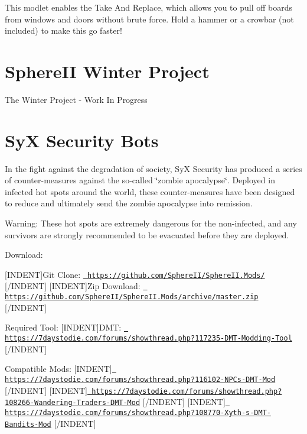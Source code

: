 This modlet enables the Take And Replace, which allows you to pull off boards from windows and doors without brute force. Hold a hammer or a crowbar (not included) to make this go faster!\hypertarget{md__c_1__users_jkilpatrick__documents__git_hub__sphere_i_i_8_mods__r_e_a_d_m_e_autotoc_md15}{}\section{Sphere\+I\+I Winter Project}\label{md__c_1__users_jkilpatrick__documents__git_hub__sphere_i_i_8_mods__r_e_a_d_m_e_autotoc_md15}
The Winter Project -\/ Work In Progress\hypertarget{md__c_1__users_jkilpatrick__documents__git_hub__sphere_i_i_8_mods__r_e_a_d_m_e_autotoc_md16}{}\section{Sy\+X Security Bots}\label{md__c_1__users_jkilpatrick__documents__git_hub__sphere_i_i_8_mods__r_e_a_d_m_e_autotoc_md16}
In the fight against the degradation of society, SyX Security has produced a series of counter-\/measures against the so-\/called \char`\"{}zombie apocalypse\char`\"{}. Deployed in infected hot spots around the world, these counter-\/measures have been designed to reduce and ultimately send the zombie apocalypse into remission.

Warning\+: These hot spots are extremely dangerous for the non-\/infected, and any survivors are strongly recommended to be evacuated before they are deployed.



 Download\+:

\mbox{[}I\+N\+D\+E\+NT\mbox{]}Git Clone\+: \href{https://github.com/SphereII/SphereII.Mods/}{\texttt{ https\+://github.\+com/\+Sphere\+I\+I/\+Sphere\+I\+I.\+Mods/}} \mbox{[}/\+I\+N\+D\+E\+NT\mbox{]} \mbox{[}I\+N\+D\+E\+NT\mbox{]}Zip Download\+: \href{https://github.com/SphereII/SphereII.Mods/archive/master.zip}{\texttt{ https\+://github.\+com/\+Sphere\+I\+I/\+Sphere\+I\+I.\+Mods/archive/master.\+zip}} \mbox{[}/\+I\+N\+D\+E\+NT\mbox{]}

Required Tool\+: \mbox{[}I\+N\+D\+E\+NT\mbox{]}D\+MT\+: \href{https://7daystodie.com/forums/showthread.php?117235-DMT-Modding-Tool}{\texttt{ https\+://7daystodie.\+com/forums/showthread.\+php?117235-\/\+D\+M\+T-\/\+Modding-\/\+Tool}} \mbox{[}/\+I\+N\+D\+E\+NT\mbox{]}

Compatible Mods\+: \mbox{[}I\+N\+D\+E\+NT\mbox{]}\href{https://7daystodie.com/forums/showthread.php?116102-NPCs-DMT-Mod}{\texttt{ https\+://7daystodie.\+com/forums/showthread.\+php?116102-\/\+N\+P\+Cs-\/\+D\+M\+T-\/\+Mod}} \mbox{[}/\+I\+N\+D\+E\+NT\mbox{]} \mbox{[}I\+N\+D\+E\+NT\mbox{]}\href{https://7daystodie.com/forums/showthread.php?108266-Wandering-Traders-DMT-Mod}{\texttt{ https\+://7daystodie.\+com/forums/showthread.\+php?108266-\/\+Wandering-\/\+Traders-\/\+D\+M\+T-\/\+Mod}} \mbox{[}/\+I\+N\+D\+E\+NT\mbox{]} \mbox{[}I\+N\+D\+E\+NT\mbox{]}\href{https://7daystodie.com/forums/showthread.php?108770-Xyth-s-DMT-Bandits-Mod}{\texttt{ https\+://7daystodie.\+com/forums/showthread.\+php?108770-\/\+Xyth-\/s-\/\+D\+M\+T-\/\+Bandits-\/\+Mod}} \mbox{[}/\+I\+N\+D\+E\+NT\mbox{]}



 